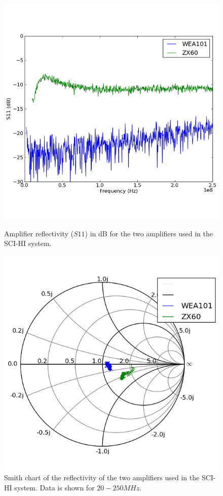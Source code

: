 \begin{figure}[htb]
\centering
\begin{minipage}[b]{0.47\textwidth}
\centering
\includegraphics[width=0.95\linewidth]{SCIHI_system/figures/amp_S11_dB.png}
\caption{Amplifier reflectivity ($S11$) in dB for the two amplifiers used in the SCI-HI system.}
\label{Fig:amp_comp_dB}
\end{minipage}%
\begin{minipage}[b]{0.02\textwidth}
\hspace{1cm}
\end{minipage}%
\begin{minipage}[b]{0.47\textwidth}
\centering
\includegraphics[width=0.95\linewidth]{SCIHI_system/figures/amp_S11_Smith.png}
\caption{Smith chart of the reflectivity of the two amplifiers used in the SCI-HI system. Data is shown for $20-250 MHz$. }
\label{Fig:amp_comp_Smith}
\end{minipage}
\end{figure}


